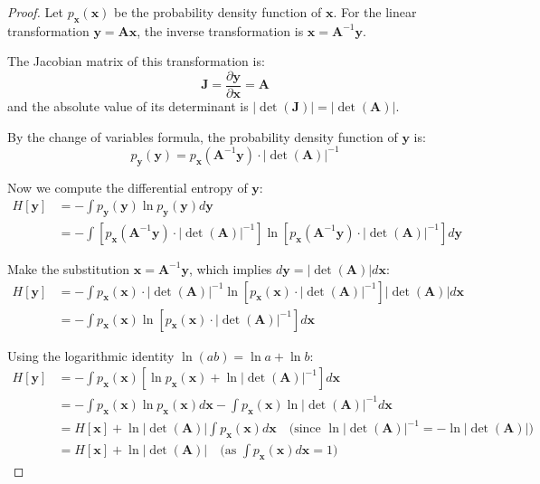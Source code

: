 \documentclass[../main.tex]{subfiles}
\begin{document}
\begin{proof}
    
Let $p_{\mathbf{x}}(\mathbf{x})$ be the probability density function of $\mathbf{x}$. For the linear transformation $\mathbf{y} = \mathbf{A}\mathbf{x}$, the inverse transformation is $\mathbf{x} = \mathbf{A}^{-1}\mathbf{y}$.

The Jacobian matrix of this transformation is:
$$
\mathbf{J} = \frac{\partial \mathbf{y}}{\partial \mathbf{x}} = \mathbf{A}
$$
and the absolute value of its determinant is $|\det(\mathbf{J})| = |\det(\mathbf{A})|$.

By the change of variables formula, the probability density function of $\mathbf{y}$ is:
\begin{equation}
p_{\mathbf{y}}(\mathbf{y}) = p_{\mathbf{x}}(\mathbf{A}^{-1}\mathbf{y}) \cdot |\det(\mathbf{A})|^{-1}
\end{equation}

Now we compute the differential entropy of $\mathbf{y}$:
\begin{align*}
H[\mathbf{y}] &= -\int p_{\mathbf{y}}(\mathbf{y}) \ln p_{\mathbf{y}}(\mathbf{y})  d\mathbf{y} \\
&= -\int \left[ p_{\mathbf{x}}(\mathbf{A}^{-1}\mathbf{y}) \cdot |\det(\mathbf{A})|^{-1} \right] \ln \left[ p_{\mathbf{x}}(\mathbf{A}^{-1}\mathbf{y}) \cdot |\det(\mathbf{A})|^{-1} \right]  d\mathbf{y}
\end{align*}

Make the substitution $\mathbf{x} = \mathbf{A}^{-1}\mathbf{y}$, which implies $d\mathbf{y} = |\det(\mathbf{A})|  d\mathbf{x}$:
\begin{align*}
H[\mathbf{y}] &= -\int p_{\mathbf{x}}(\mathbf{x}) \cdot |\det(\mathbf{A})|^{-1} \ln \left[ p_{\mathbf{x}}(\mathbf{x}) \cdot |\det(\mathbf{A})|^{-1} \right] |\det(\mathbf{A})|  d\mathbf{x} \\
&= -\int p_{\mathbf{x}}(\mathbf{x}) \ln \left[ p_{\mathbf{x}}(\mathbf{x}) \cdot |\det(\mathbf{A})|^{-1} \right]  d\mathbf{x}
\end{align*}

Using the logarithmic identity $\ln(ab) = \ln a + \ln b$:
\begin{align*}
H[\mathbf{y}] &= -\int p_{\mathbf{x}}(\mathbf{x}) \left[ \ln p_{\mathbf{x}}(\mathbf{x}) + \ln |\det(\mathbf{A})|^{-1} \right]  d\mathbf{x} \\
&= -\int p_{\mathbf{x}}(\mathbf{x}) \ln p_{\mathbf{x}}(\mathbf{x})  d\mathbf{x} - \int p_{\mathbf{x}}(\mathbf{x}) \ln |\det(\mathbf{A})|^{-1}  d\mathbf{x} \\
&= H[\mathbf{x}] + \ln |\det(\mathbf{A})| \int p_{\mathbf{x}}(\mathbf{x})  d\mathbf{x} \quad \text{(since $\ln |\det(\mathbf{A})|^{-1} = -\ln |\det(\mathbf{A})|$)} \\
&= H[\mathbf{x}] + \ln |\det(\mathbf{A})| \quad \text{(as $\int p_{\mathbf{x}}(\mathbf{x})  d\mathbf{x} = 1$)}
\end{align*}
\end{proof}
\end{document}
